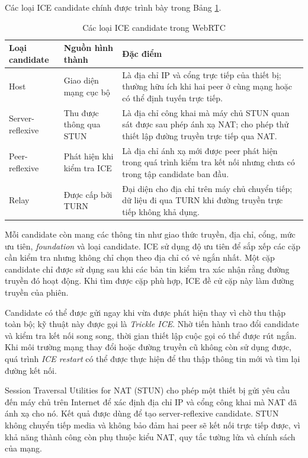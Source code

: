 Các loại ICE candidate chính được trình bày trong Bảng \ref{tab:ice_candidate_types}.

\begin{table}[H]
\centering
\caption{Các loại ICE candidate trong WebRTC}
\label{tab:ice_candidate_types}
\small
\begin{tabularx}{\textwidth}{|p{3.2cm}|p{3.2cm}|X|}
\hline
\textbf{Loại candidate} & \textbf{Nguồn hình thành} & \textbf{Đặc điểm} \\
\hline
Host & Giao diện mạng cục bộ & Là địa chỉ IP và cổng trực tiếp của thiết bị; thường hữu ích khi hai peer ở cùng mạng hoặc có thể định tuyến trực tiếp. \\
\hline
Server-reflexive & Thu được thông qua STUN & Là địa chỉ công khai mà máy chủ STUN quan sát được sau phép ánh xạ NAT; cho phép thử thiết lập đường truyền trực tiếp qua NAT. \\
\hline
Peer-reflexive & Phát hiện khi kiểm tra ICE & Là địa chỉ ánh xạ mới được peer phát hiện trong quá trình kiểm tra kết nối nhưng chưa có trong tập candidate ban đầu. \\
\hline
Relay & Được cấp bởi TURN & Đại diện cho địa chỉ trên máy chủ chuyển tiếp; dữ liệu đi qua TURN khi đường truyền trực tiếp không khả dụng. \\
\hline
\end{tabularx}
\end{table}

Mỗi candidate còn mang các thông tin như giao thức truyền, địa chỉ, cổng, mức ưu tiên, \textit{foundation} và loại candidate. ICE sử dụng độ ưu tiên để sắp xếp các cặp cần kiểm tra nhưng không chỉ chọn theo địa chỉ có vẻ ngắn nhất. Một cặp candidate chỉ được sử dụng sau khi các bản tin kiểm tra xác nhận rằng đường truyền đó hoạt động. Khi tìm được cặp phù hợp, ICE đề cử cặp này làm đường truyền của phiên.

Candidate có thể được gửi ngay khi vừa được phát hiện thay vì chờ thu thập toàn bộ; kỹ thuật này được gọi là \textit{Trickle ICE}. Nhờ tiến hành trao đổi candidate và kiểm tra kết nối song song, thời gian thiết lập cuộc gọi có thể được rút ngắn. Khi môi trường mạng thay đổi hoặc đường truyền cũ không còn sử dụng được, quá trình \textit{ICE restart} có thể được thực hiện để thu thập thông tin mới và tìm lại đường kết nối.

Session Traversal Utilities for NAT (STUN) cho phép một thiết bị gửi yêu cầu đến máy chủ trên Internet để xác định địa chỉ IP và cổng công khai mà NAT đã ánh xạ cho nó. Kết quả được dùng để tạo server-reflexive candidate. STUN không chuyển tiếp media và không bảo đảm hai peer sẽ kết nối trực tiếp được, vì khả năng thành công còn phụ thuộc kiểu NAT, quy tắc tường lửa và chính sách của mạng.

